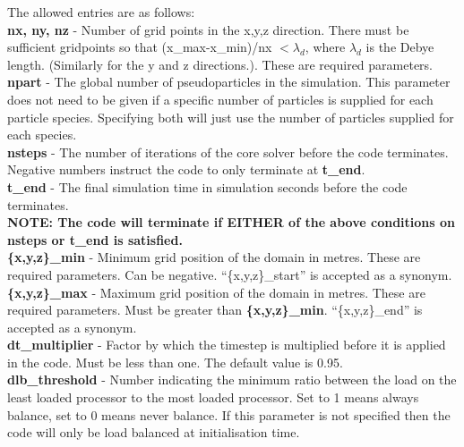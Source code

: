 \documentclass[12pt,a4paper]{article}
\newcommand{\emphtext}{\color{warwickdark} \fontfamily{phv}\selectfont\large\bf}
\newcommand{\inlineemph}[1]{{\color{warwicklight} \bf{#1}}}
\begin{document}
The allowed entries are as follows:\\

{\emphtext nx, ny, nz} - Number of grid points in the x,y,z direction. There
must be sufficient gridpoints so that (x\_max-x\_min)/nx $< \lambda_d$, where
$\lambda_d$ is the Debye length. (Similarly for the y and z directions.).
These are required parameters.\\

{\emphtext npart} - The global number of pseudoparticles in the
simulation. This parameter does not need to be given if a specific number
of particles is supplied for each particle species. Specifying both will just
use the number of particles supplied for each species.\\

{\emphtext nsteps} - The number of iterations of the core solver before the
code terminates. Negative numbers instruct the code to only terminate at
\inlineemph{t\_end}.\\

{\emphtext t\_end} - The final simulation time in simulation seconds before the
code terminates.\\

{\emphtext NOTE: The code will terminate if EITHER of the above conditions on
nsteps or t\_end is satisfied.}\\

{\emphtext \{x,y,z\}\_min} - Minimum grid position of the domain in
metres. These are required parameters. Can be negative. ``\{x,y,z\}\_start'' is accepted as a synonym.\\

{\emphtext \{x,y,z\}\_max} - Maximum grid position of the domain in
metres. These are required parameters. Must be greater than
\inlineemph{\{x,y,z\}\_min}.  ``\{x,y,z\}\_end'' is accepted as a synonym.\\

{\emphtext dt\_multiplier} - Factor by which the timestep is multiplied before
it is applied in the code. Must be less than one. The default value is 0.95.\\

{\emphtext dlb\_threshold} - Number indicating the minimum ratio between the
load on the least loaded processor to the most loaded processor. Set to 1 means
always balance, set to 0 means never balance. If this parameter is not
specified then the code will only be load balanced at initialisation time.\\
\end{document}
